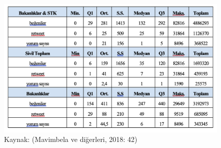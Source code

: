 \documentclass[
]{book}
\begin{document}
\begin{figure}
\includegraphics[width=0.95\linewidth,height=0.95\textheight]{tablolar-sekiller/tablo-4-4} \caption{Kaynak: (Mavimbela ve diğerleri, 2018: 42)}\label{fig:unnamed-chunk-8}
\end{figure}
\end{document}
